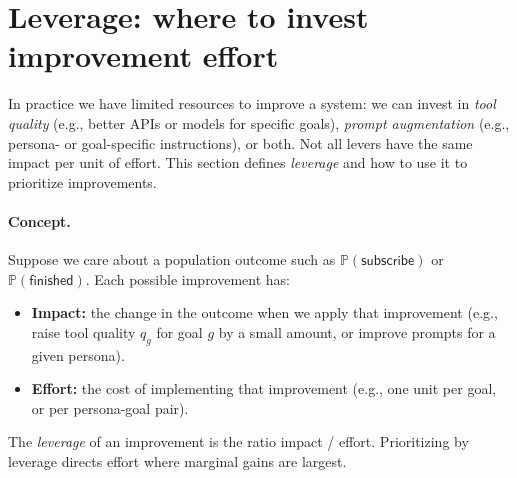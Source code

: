 \section{Leverage: where to invest improvement effort}
\label{sec:leverage}

In practice we have limited resources to improve a system: we can invest in \emph{tool quality} (e.g., better APIs or models for specific goals), \emph{prompt augmentation} (e.g., persona- or goal-specific instructions), or both. Not all levers have the same impact per unit of effort. This section defines \emph{leverage} and how to use it to prioritize improvements.

\paragraph{Concept.}
Suppose we care about a population outcome such as $\mathbb{P}(\mathsf{subscribe})$ or $\mathbb{P}(\mathsf{finished})$. Each possible improvement has:
\begin{itemize}
  \item \textbf{Impact:} the change in the outcome when we apply that improvement (e.g., raise tool quality $q_g$ for goal $g$ by a small amount, or improve prompts for a given persona).
  \item \textbf{Effort:} the cost of implementing that improvement (e.g., one unit per goal, or per persona-goal pair).
\end{itemize}
The \emph{leverage} of an improvement is the ratio impact / effort. Prioritizing by leverage directs effort where marginal gains are largest.

